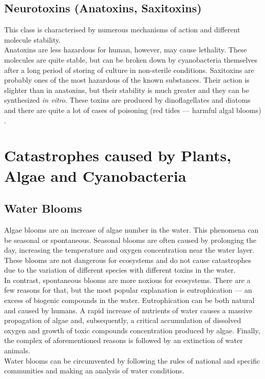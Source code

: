 \subsection{Neurotoxins (Anatoxins, Saxitoxins)}
This class is characterised by numerous mechanisms of action and different molecule stability. \\ 
Anatoxins are less hazardous for human, however, may cause lethality. These molecules are quite stable, but can be broken down by cyanobacteria themselves after a long period of storing of culture in non-sterile conditions. 
Saxitoxins are probably ones of the most hazardous of the known substances. Their action is slighter than in anatoxins, but their stability is much greater and they can be synthesized \textit{in vitro}.  These toxins are produced by dinoflagellates and diatoms and there are quite a lot of cases of poisoning (red tides — harmful algal blooms) \parencite{Yunes2019} \parencite{Sivonen2009}. 

\section{Catastrophes caused by Plants, Algae and Cyanobacteria}
\subsection{Water Blooms}
Algae blooms are an increase of algae number in the water. This phenomena can be seasonal or spontaneous. Seasonal blooms are often caused by prolonging the day, increasing the temperature and oxygen concentration near the water layer. These blooms are not dangerous for ecosystems and do not cause catastrophes due to the variation of different species with different toxins in the water. \\
In contrast, spontaneous blooms are more noxious for ecosystems. There are a few reasons for that, but the most popular explanation is eutrophication — an excess of  biogenic compounds in the water. Eutrophication can be both natural and caused by humans. A rapid increase of nutrients of water causes a massive propagation of algae and, subsequently, a critical accumulation of dissolved oxygen and growth of toxic compounds concentration produced by algae. Finally, the complex of aforementioned reasons is followed by an extinction of water animals. \\
Water blooms can be circumvented by following the rules of national and specific communities and making an analysis of water conditions. 

